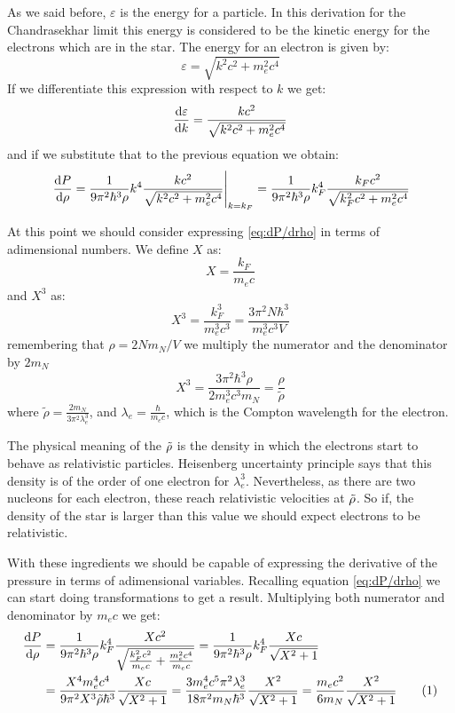 \documentclass[a4paper]{article}
\newcommand\numberthis{\addtocounter{equation}{1}\tag{\theequation}}
\begin{document}
As we said before, $\varepsilon$ is the energy for a particle. In this derivation for the Chandrasekhar limit this energy is considered to be the kinetic energy for the electrons which are in the star. The energy for an electron is given by:
\begin{equation}
    \varepsilon=\sqrt{k^2c^2+m_e^2c^4}
\end{equation}
If we differentiate this expression with respect to $k$ we get:
\begin{equation}
    \odv{\varepsilon}{k}=\frac{kc^2}{\sqrt{k^2c^2+m_e^2c^4}}
\end{equation}
and if we substitute that to the previous equation we obtain:
\begin{equation}\label{eq:dP/drho}
    \left.\odv{P}{\rho}=\frac{1}{9\pi^2\hbar^3\rho}k^4\frac{kc^2}{\sqrt{k^2c^2+m_e^2c^4}}\right|_{k=k_F}=\frac{1}{9\pi^2\hbar^3\rho}k_F^4\frac{k_Fc^2}{\sqrt{k_F^2c^2+m_e^2c^4}}
\end{equation}

At this point we should consider expressing \eqref{eq:dP/drho} in terms of adimensional numbers. We define $X$ as:
\begin{equation}
    X=\frac{k_F}{m_ec}
\end{equation}
and $X^3$ as:
\begin{equation}
    X^3=\frac{k_F^3}{m_e^3c^3}=\frac{3\pi^2N\hbar^3}{m_e^3c^3V}
\end{equation}
remembering that $\rho=2Nm_N/V$ we multiply the numerator and the denominator by $2m_N$
\begin{equation}
    X^3=\frac{3\pi^2\hbar^3\rho}{2m_e^3c^3m_N}=\frac{\rho}{\tilde{\rho}}
\end{equation}
where $\tilde{\rho}=\frac{2m_N}{3\pi^2\lambda_e^3}$, and $\lambda_e=\frac{\hbar}{m_ec}$, which is the Compton wavelength for the electron.

The physical meaning of the $\Tilde{\rho}$ is the density in which the electrons start to behave as relativistic particles. Heisenberg uncertainty principle says that this density is of the order of one electron for $\lambda_e^3$. Nevertheless, as there are two nucleons for each electron, these reach relativistic velocities at $\Tilde{\rho}$. So if, the density of the star is larger than this value we should expect electrons to be relativistic.

With these ingredients we should be capable of expressing the derivative of the pressure in terms of adimensional variables. Recalling equation \eqref{eq:dP/drho} we can start doing transformations to get a result. Multiplying both numerator and denominator by $m_ec$ we get:
\begin{align*}\label{eq:dP/drho,adim}
    \odv{P}{\rho}& =\frac{1}{9\pi^2\hbar^3\rho}k_F^4\frac{Xc^2}{\sqrt{\frac{k_F^2c^2}{m_ec}+\frac{m_e^2c^4}{m_ec}}}=\frac{1}{9\pi^2\hbar^3\rho}k_F^4\frac{Xc}{\sqrt{X^2+1}}\\
    & =\frac{X^4m_e^4c^4}{9\pi^2X^3\tilde{\rho}\hbar^3}\frac{Xc}{\sqrt{X^2+1}}=\frac{3m_e^4c^5\pi^2\lambda_e^3}{18\pi^2m_N\hbar^3}\frac{X^2}{\sqrt{X^2+1}}=\frac{m_ec^2}{6m_N}\frac{X^2}{\sqrt{X^2+1}}\numberthis
\end{align*}
\end{document}
